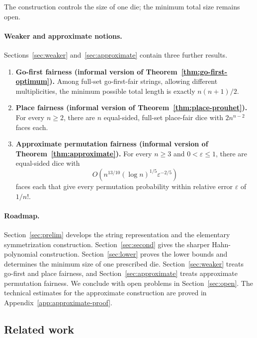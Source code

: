 \documentclass[11pt]{article}
\theoremstyle{definition}
\theoremstyle{remark}
\begin{document}
The construction controls the size of one die; the minimum total size
remains open.

\paragraph{Weaker and approximate notions.}
Sections~\ref{sec:weaker} and~\ref{sec:approximate} contain three further results.

\begin{enumerate}[label=\textup{(\roman*)},leftmargin=*,itemsep=.45em]
  \item \textbf{Go-first fairness
    (informal version of Theorem~\ref{thm:go-first-optimum}).}
    Among full-set go-first-fair strings, allowing different multiplicities,
    the minimum possible total length is exactly \(n(n+1)/2\).

  \item \textbf{Place fairness
    (informal version of Theorem~\ref{thm:place-prouhet}).}
    For every \(n\geq2\), there are \(n\) equal-sided, full-set place-fair
    dice with \(2n^{n-2}\) faces each.

  \item \textbf{Approximate permutation fairness
    (informal version of Theorem~\ref{thm:approximate}).}
    For every \(n\geq3\) and \(0<\varepsilon\leq1\), there are equal-sided
    dice with
    \[
      O\!\left(n^{13/10}(\log n)^{1/5}\varepsilon^{-2/5}\right)
    \]
    faces each that give every permutation probability within relative
    error \(\varepsilon\) of \(1/n!\).
\end{enumerate}

\paragraph{Roadmap.}
Section~\ref{sec:prelim} develops the string representation and the elementary
symmetrization construction.  Section~\ref{sec:second} gives the sharper
Hahn-polynomial construction.  Section~\ref{sec:lower} proves the lower
bounds and determines the minimum size of one prescribed die.
Section~\ref{sec:weaker} treats go-first and place fairness, and
Section~\ref{sec:approximate} treats approximate permutation fairness.
We conclude with open problems in Section~\ref{sec:open}.
The technical estimates for the approximate construction are proved in
Appendix~\ref{app:approximate-proof}.

\subsection{Related work}
\end{document}

